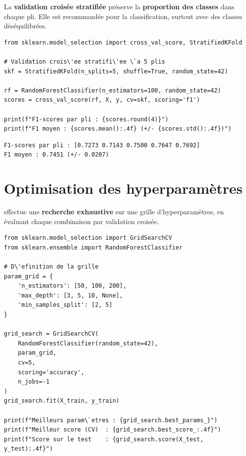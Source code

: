 \begin{definition}
La \textbf{validation crois\'ee stratifi\'ee} pr\'eserve la \textbf{proportion des classes} dans chaque pli. Elle est recommand\'ee pour la classification, surtout avec des classes d\'es\'equilibr\'ees.
\end{definition}

\begin{codeblock}[title=\textbf{Python}]
\begin{verbatim}
from sklearn.model_selection import cross_val_score, StratifiedKFold

# Validation crois\'ee stratifi\'ee \`a 5 plis
skf = StratifiedKFold(n_splits=5, shuffle=True, random_state=42)

rf = RandomForestClassifier(n_estimators=100, random_state=42)
scores = cross_val_score(rf, X, y, cv=skf, scoring='f1')

print(f"F1-scores par pli : {scores.round(4)}")
print(f"F1 moyen : {scores.mean():.4f} (+/- {scores.std():.4f})")
\end{verbatim}
\end{codeblock}

\begin{codeoutput}
\begin{verbatim}
F1-scores par pli : [0.7273 0.7143 0.7500 0.7647 0.7692]
F1 moyen : 0.7451 (+/- 0.0207)
\end{verbatim}
\end{codeoutput}

\section{Optimisation des hyperparam\`etres}
\label{sec:gridsearch}


\begin{definition}[GridSearchCV]
 effectue une \textbf{recherche exhaustive} sur une grille d'hyperparam\`etres, en \'evaluant chaque combinaison par validation crois\'ee.
\end{definition}

\begin{codeblock}[title=\textbf{Python}]
\begin{verbatim}
from sklearn.model_selection import GridSearchCV
from sklearn.ensemble import RandomForestClassifier

# D\'efinition de la grille
param_grid = {
    'n_estimators': [50, 100, 200],
    'max_depth': [3, 5, 10, None],
    'min_samples_split': [2, 5]
}

grid_search = GridSearchCV(
    RandomForestClassifier(random_state=42),
    param_grid,
    cv=5,
    scoring='accuracy',
    n_jobs=-1
)
grid_search.fit(X_train, y_train)

print(f"Meilleurs param\`etres : {grid_search.best_params_}")
print(f"Meilleur score (CV)  : {grid_search.best_score_:.4f}")
print(f"Score sur le test    : {grid_search.score(X_test, y_test):.4f}")
\end{verbatim}
\end{codeblock}


